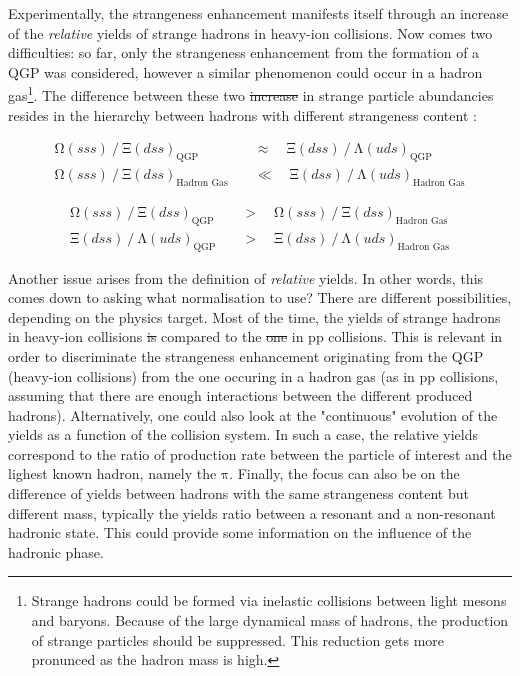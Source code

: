 \documentclass[ALICE,manyauthors]{cernphprep}
\newcommand{\rmPi}          {\mbox{$\mathrm {\pi}$}\xspace}
\newcommand{\rmLambda}          {\mbox{$\mathrm {\Lambda}$}\xspace}
\newcommand{\rmXi}      {\mbox{$\mathrm{\Xi}$}\xspace}
\newcommand{\rmOmega}   {\mbox{$\mathrm {\Omega}$}\xspace}
\providecommand{\DIFaddtex}[1]{{\protect\color{blue}\uwave{#1}}} %
\providecommand{\DIFdeltex}[1]{{\protect\color{red}\sout{#1}}}                      %
\providecommand{\DIFaddbegin}{} %
\providecommand{\DIFaddend}{} %
\providecommand{\DIFdelbegin}{} %
\providecommand{\DIFdelend}{} %
\providecommand{\DIFadd}[1]{\texorpdfstring{\DIFaddtex{#1}}{#1}} %
\providecommand{\DIFdel}[1]{\texorpdfstring{\DIFdeltex{#1}}{}} %
\newcommand{\DIFscaledelfig}{0.5}
\newlength{\DIFdelgraphicswidth} %
\newlength{\DIFdelgraphicsheight} %
\newcommand{\DIFaddincludegraphics}[2][]{{\color{blue}\fbox{\DIFOincludegraphics[#1]{#2}}}} %
\newcommand{\DIFdelincludegraphics}[2][]{%
\sbox{\DIFdelgraphicsbox}{\DIFOincludegraphics[#1]{#2}}%
\settoboxwidth{\DIFdelgraphicswidth}{\DIFdelgraphicsbox} %
\settoboxtotalheight{\DIFdelgraphicsheight}{\DIFdelgraphicsbox} %
\scalebox{\DIFscaledelfig}{%
\parbox[b]{\DIFdelgraphicswidth}{\usebox{\DIFdelgraphicsbox}\\[-\baselineskip] \rule{\DIFdelgraphicswidth}{0em}}\llap{\resizebox{\DIFdelgraphicswidth}{\DIFdelgraphicsheight}{%
\setlength{\unitlength}{\DIFdelgraphicswidth}%
\begin{picture}(1,1)%
\thicklines\linethickness{2pt} %
{\color[rgb]{1,0,0}\put(0,0){\framebox(1,1){}}}%
{\color[rgb]{1,0,0}\put(0,0){\line( 1,1){1}}}%
{\color[rgb]{1,0,0}\put(0,1){\line(1,-1){1}}}%
\end{picture}%
}\hspace*{3pt}}} %
} %
\DeclareRobustCommand{\DIFaddbegin}{\DIFOaddbegin \let\includegraphics\DIFaddincludegraphics} %
\DeclareRobustCommand{\DIFaddend}{\DIFOaddend \let\includegraphics\DIFOincludegraphics} %
\DeclareRobustCommand{\DIFdelbegin}{\DIFOdelbegin \let\includegraphics\DIFdelincludegraphics} %
\DeclareRobustCommand{\DIFdelend}{\DIFOaddend \let\includegraphics\DIFOincludegraphics} %
\begin{document}
Experimentally, the strangeness enhancement manifests itself through an increase of the \textit{relative} yields of strange hadrons in heavy-ion collisions. Now comes two difficulties: so far, only the strangeness enhancement from the formation of a QGP was considered, however a similar phenomenon could occur in a hadron gas\footnote{Strange hadrons could be formed via inelastic collisions between light mesons and baryons. Because of the large dynamical mass of hadrons, the production of strange particles should be suppressed. This reduction gets more pronunced as the hadron mass is high.}. The difference between these two \DIFdelbegin \DIFdel{increase }\DIFdelend \DIFaddbegin \DIFadd{increases }\DIFaddend in strange particle abundancies resides in the hierarchy between hadrons with different strangeness content \cite{maireProductionBaryonsMultietranges2011}:

\begin{align}
\rmOmega(sss)\ /\ \rmXi(dss) _{\textrm{QGP}} \quad &\approx \quad \rmXi(dss)\ /\ \rmLambda(uds) _{\textrm{QGP}}\\
\rmOmega(sss)\ /\ \rmXi(dss) _{\textrm{Hadron Gas}} \quad &\ll \quad \rmXi(dss)\ /\ \rmLambda(uds) _{\textrm{Hadron Gas}}
\end{align}

\begin{align}
\rmOmega(sss)\ /\ \rmXi(dss) _{\textrm{QGP}} \quad &> \quad \rmOmega(sss)\ /\ \rmXi(dss) _{\textrm{Hadron Gas}}\\
\rmXi(dss)\ /\ \rmLambda(uds) _{\textrm{QGP}} \quad &> \quad \rmXi(dss)\ /\ \rmLambda(uds) _{\textrm{Hadron Gas}}
\end{align}


Another issue arises from the definition of \textit{relative} yields. In other words, this comes down to asking what normalisation to use? There are different possibilities, depending on the physics target. Most of the time, the yields of strange hadrons in heavy-ion collisions \DIFdelbegin \DIFdel{is }\DIFdelend \DIFaddbegin \DIFadd{are }\DIFaddend compared to the \DIFdelbegin \DIFdel{one }\DIFdelend \DIFaddbegin \DIFadd{ones }\DIFaddend in pp collisions. This is relevant in order to discriminate the strangeness enhancement originating from the QGP (heavy-ion collisions) from the one occuring in a hadron gas (as in pp collisions, assuming that there are enough interactions between the different produced hadrons). Alternatively, one could also look at the "continuous" evolution of the yields as a function of the collision system. In such a case, the relative yields correspond to the ratio of production rate between the particle of interest and the lighest known hadron, namely the \rmPi. Finally, the focus can also be on the difference of yields between hadrons with the same strangeness content but different mass, typically the yields ratio between a resonant and a non-resonant hadronic state. This could provide some information on the influence of the hadronic phase.\\
\end{document}

